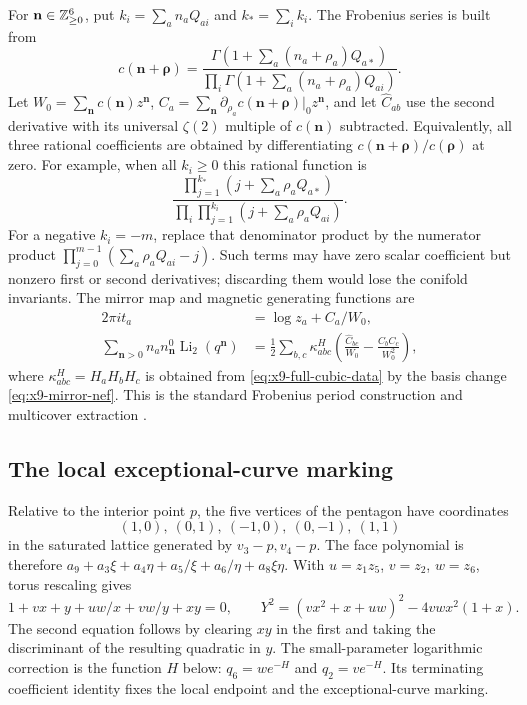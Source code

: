 For $\mathbf n\in\mathbb Z_{\geq0}^6$, put
$k_i=\sum_a n_aQ_{ai}$ and $k_*=\sum_i k_i$.
The Frobenius series is built from
\begin{equation}
 c(\mathbf n+\boldsymbol\rho)=
 \frac{\Gamma(1+\sum_a(n_a+\rho_a)Q_{a*})}
      {\prod_i\Gamma(1+\sum_a(n_a+\rho_a)Q_{ai})}.
 \label{eq:x9-mirror-gamma}
\end{equation}
Let $W_0=\sum_{\mathbf n}c(\mathbf n)z^{\mathbf n}$,
$C_a=\sum_{\mathbf n}\partial_{\rho_a}c(\mathbf n+\boldsymbol\rho)|_0
z^{\mathbf n}$, and let $\widehat C_{ab}$ use the second
derivative with its universal $\zeta(2)$ multiple of $c(\mathbf n)$
subtracted. Equivalently, all three rational coefficients are
obtained by differentiating
$c(\mathbf n+\boldsymbol\rho)/c(\boldsymbol\rho)$ at zero.
For example, when all $k_i\geq0$ this rational function is
\begin{equation}
 \frac{\prod_{j=1}^{k_*}(j+\sum_a\rho_aQ_{a*})}
      {\prod_i\prod_{j=1}^{k_i}(j+\sum_a\rho_aQ_{ai})}.
 \label{eq:x9-mirror-rational-coefficient}
\end{equation}
For a negative $k_i=-m$, replace that denominator product by
the numerator product
$\prod_{j=0}^{m-1}(\sum_a\rho_aQ_{ai}-j)$.
Such terms may have zero scalar coefficient but nonzero first or
second derivatives; discarding them would lose the conifold
invariants. The mirror map and magnetic generating functions are
\begin{equation}
 \begin{aligned}
 2\pi i t_a&=\log z_a+C_a/W_0,\\
 \sum_{\mathbf n>0}n_a n^0_{\mathbf n}\operatorname{Li}_2(q^{\mathbf n})
 &=\frac12\sum_{b,c}\kappa^{H}_{abc}
       \left(\frac{\widehat C_{bc}}{W_0}
                  -\frac{C_bC_c}{W_0^2}\right),
 \end{aligned}
 \label{eq:x9-mirror-master}
\end{equation}
where $\kappa^H_{abc}=H_aH_bH_c$ is obtained from
\eqref{eq:x9-full-cubic-data} by the basis change
\eqref{eq:x9-mirror-nef}. This is the standard
Frobenius period construction and multicover extraction
\cite[Section~4.4 and Appendix~A]{Demirtas:2024Mirror}.

\subsection{The local exceptional-curve marking}
Relative to the interior point $p$, the five vertices of the
pentagon have coordinates
\[
 (1,0),\ (0,1),\ (-1,0),\ (0,-1),\ (1,1)
\]
in the saturated lattice generated by $v_3-p,v_4-p$.
The face polynomial is therefore
$a_9+a_3\xi+a_4\eta+a_5/\xi+a_6/\eta+a_8\xi\eta$.
With $u=z_1z_5$, $v=z_2$, $w=z_6$, torus rescaling gives
\begin{equation}
 1+vx+y+uw/x+vw/y+xy=0,
 \qquad
 Y^2=(vx^2+x+uw)^2-4vw x^2(1+x).
 \label{eq:x9-local-elliptic-quartic}
\end{equation}
The second equation follows by clearing $xy$ in the first and
taking the discriminant of the resulting quadratic in $y$.
The small-parameter logarithmic correction is the function $H$ below:
$q_6=w e^{-H}$ and $q_2=v e^{-H}$. Its terminating coefficient
identity fixes the local endpoint and the exceptional-curve marking.

